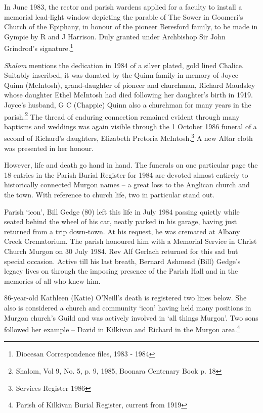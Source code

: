 In June 1983, the rector and parish wardens applied for a faculty to install a memorial lead-light window depicting the parable of The Sower in Goomeri's Church of the Epiphany, in honour of the pioneer Beresford family, to be made in Gympie by R and J Harrison. Duly granted under Archbishop Sir John Grindrod's signature.\footnote{Diocesan Correspondence files, 1983 - 1984}


\emph{Shalom} mentions the dedication in 1984 of a silver plated, gold lined Chalice. Suitably inscribed, it was donated by the Quinn family in memory of Joyce Quinn (McIntosh), grand-daughter of pioneer and churchman, Richard Maudsley whose daughter Ethel McIntosh had died following her daughter's birth in 1919. Joyce's husband, G C (Chappie) Quinn also a churchman for many years in the parish.\footnote{Shalom, Vol 9, No. 5, p. 9, 1985, Boonara Centenary Book p. 18} The thread of enduring connection remained evident through many baptisms and weddings was again visible through the 1 October 1986 funeral of a second of Richard's daughters, Elizabeth Pretoria McIntosh.\footnote{Services Register 1986} A new Altar cloth was presented in her honour.


However, life and death go hand in hand. The funerals on one particular page the 18 entries in the Parish Burial Register for 1984 are devoted almost entirely to historically connected Murgon names -- a great loss to the Anglican church and the town. With reference to church life, two in particular stand out.



Parish `icon', Bill Gedge (80) left this life in July 1984 passing quietly while seated behind the wheel of his car, neatly parked in his garage, having just returned from a trip down-town. At his request, he was cremated at Albany Creek Crematorium. The parish honoured him with a Memorial Service in Christ Church Murgon on 30 July 1984. Rev Alf Gerlach returned for this sad but special occasion. Active till his last breath, Bernard Ashmead (Bill) Gedge's legacy lives on through the imposing presence of the Parish Hall and in the memories of all who knew him.



86-year-old Kathleen (Katie) O'Neill's death is registered two lines below. She also is considered a church and community `icon' having held many positions in Murgon church's Guild and was actively involved in `all things Murgon'. Two sons followed her example -- David in Kilkivan and Richard in the Murgon area.\footnote{Parish of Kilkivan Burial Register, current from 1919}


